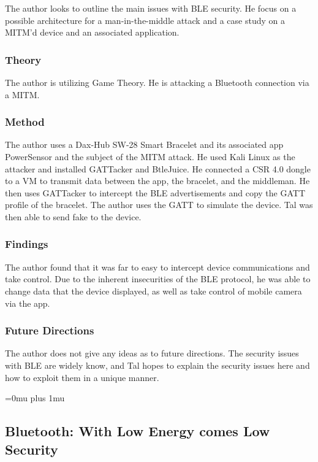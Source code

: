 \noindent
The author looks to outline the main issues with BLE security. He focus on a possible architecture for a man-in-the-middle attack and a case study on a MITM'd device and an associated application. 

\subsubsection{Theory}

\noindent
The author is utilizing Game Theory. He is attacking a Bluetooth connection via a MITM. 

\subsubsection{Method}

\noindent
The author uses a Dax-Hub SW-28 Smart Bracelet and its associated app PowerSensor and the subject of the MITM attack. He used Kali Linux as the attacker and installed GATTacker and BtleJuice. He connected a CSR 4.0 dongle to a VM to transmit data between the app, the bracelet, and the middleman. He then uses GATTacker to intercept the BLE advertisements and copy the GATT profile of the bracelet. The author uses the GATT to simulate the device. Tal was then able to send fake to the device. 

\subsubsection{Findings}

\noindent
The author found that it was far to easy to intercept device communications and take control. Due to the inherent insecurities of the BLE protocol, he was able to change data that the device displayed, as well as take control of mobile camera via the app. 

\subsubsection{Future Directions}

\noindent
The author does not give any ideas as to future directions. The security issues with BLE are widely know, and Tal hopes to explain the security issues here and how to exploit them in a unique manner. 

\Urlmuskip=0mu plus 1mu\relax

\noindent
\subsection{{B}luetooth: {W}ith {L}ow {E}nergy comes {L}ow {S}ecurity}

